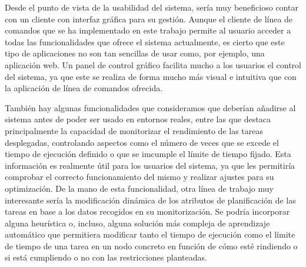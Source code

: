 Desde el punto de vista de la usabilidad del sistema, sería muy beneficioso
contar con un cliente con interfaz gráfica para su gestión. Aunque el cliente de
línea de comandos que se ha implementado en este trabajo permite al usuario
acceder a todas las funcionalidades que ofrece el sistema actualmente, es cierto
que este tipo de aplicaciones no son tan sencillas de usar como, por ejemplo,
una aplicación web. Un panel de control gráfico facilita mucho a los usuarios el
control del sistema, ya que este se realiza de forma mucho más visual e
intuitiva que con la aplicación de línea de comandos ofrecida.

También hay algunas funcionalidades que consideramos que deberían añadirse al
sistema antes de poder ser usado en entornos reales, entre las que destaca
principalmente la capacidad de monitorizar el rendimiento de las tareas
desplegadas, controlando aspectos como el número de veces que se excede el
tiempo de ejecución definido o que se imcumple el límite de tiempo fijado. Esta
información es realmente útil para los usuarios del sistema, ya que les
permitiría comprobar el correcto funcionamiento del mismo y realizar ajustes
para su optimización. De la mano de esta funcionalidad, otra línea de trabajo
muy interesante sería la modificación dinámica de los atributos de planificación
de las tareas en base a los datos recogidos en su monitorización. Se podría
incorporar alguna heurística o, incluso, alguna solución más compleja de
aprendizaje automático que permitiera modificar tanto el tiempo de ejecución
como el límite de tiempo de una tarea en un nodo concreto en función de cómo
esté rindiendo o si está cumpliendo o no con las restricciones planteadas.